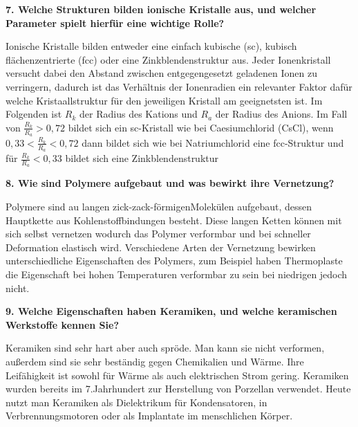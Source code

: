 \noindent\textbf{7. Welche Strukturen bilden ionische Kristalle aus, und welcher Parameter spielt hierfür eine wichtige Rolle?}\\
\begin{addmargin}[25pt]{0pt}     
Ionische Kristalle bilden entweder eine einfach kubische (sc), kubisch flächenzentrierte (fcc) oder eine Zinkblendenstruktur aus. Jeder Ionenkristall versucht dabei den Abstand zwischen entgegengesetzt geladenen Ionen zu verringern, dadurch ist das Verhältnis der Ionenradien ein relevanter Faktor dafür welche Kristaallstruktur für den jeweiligen Kristall am geeignetsten ist. Im Folgenden ist $R_k$ der Radius des Kations und $R_a$ der Radius des Anions. Im Fall von $\frac{R_k}{R_a} > 0,72$ bildet sich ein sc-Kristall wie bei Caesiumchlorid (CsCl), wenn $0,33 < \frac{R_k}{R_a} < 0,72$  dann bildet sich wie bei Natriumchlorid eine fcc-Struktur und für $\frac{R_k}{R_a} < 0,33$ bildet sich eine Zinkblendenstruktur \\
\end{addmargin}

\noindent\textbf{8. Wie sind Polymere aufgebaut und was bewirkt ihre Vernetzung?}\\
\begin{addmargin}[25pt]{0pt}     
Polymere sind au langen \glqq zick-zack-förmigen\grqq Molekülen aufgebaut, dessen Hauptkette aus Kohlenstoffbindungen besteht. Diese langen Ketten können mit sich selbst vernetzen wodurch das Polymer verformbar und bei schneller Deformation elastisch wird. Verschiedene Arten der Vernetzung bewirken unterschiedliche Eigenschaften des Polymers, zum Beispiel haben Thermoplaste die Eigenschaft bei hohen Temperaturen verformbar zu sein bei niedrigen jedoch nicht.   \\
\end{addmargin}

\noindent\textbf{9. Welche Eigenschaften haben Keramiken, und welche keramischen Werkstoffe kennen Sie?}\\
\begin{addmargin}[25pt]{0pt}     
Keramiken sind sehr hart aber auch spröde. Man kann sie nicht verformen, außerdem sind sie sehr beständig gegen Chemikalien und Wärme. Ihre Leifähigkeit ist sowohl für Wärme als auch elektrischen Strom gering. Keramiken wurden bereits im 7.Jahrhundert zur Herstellung von Porzellan verwendet. Heute nutzt man Keramiken als Dielektrikum für Kondensatoren, in Verbrennungsmotoren oder als Implantate im menschlichen Körper.    \\
\end{addmargin}

